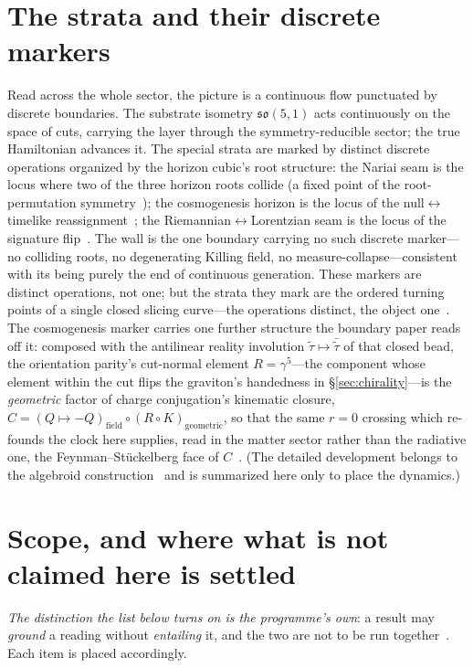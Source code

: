 \documentclass[11pt,a4paper]{article}
\theoremstyle{plain}
\theoremstyle{definition}
\theoremstyle{remark}
\newcommand{\so}{\mathfrak{so}}
\begin{document}
\section{The strata and their discrete markers}\label{sec:discrete}

Read across the whole sector, the picture is a continuous flow punctuated by discrete boundaries. The substrate isometry $\so(5,1)$ acts continuously on the space of cuts, carrying the layer through the symmetry-reducible sector; the true Hamiltonian advances it. The special strata are marked by distinct discrete operations organized by the horizon cubic's root structure: the Nariai seam is the locus where two of the three horizon roots collide (a fixed point of the root-permutation symmetry~\cite{JanzenSlicing,JanzenGroupoid}); the cosmogenesis horizon is the locus of the null$\leftrightarrow$timelike reassignment~\cite{JanzenCRframework}; the Riemannian$\leftrightarrow$Lorentzian seam is the locus of the signature flip~\cite{JanzenSlicing}. The wall is the one boundary carrying no such discrete marker---no colliding roots, no degenerating Killing field, no measure-collapse---consistent with its being purely the end of continuous generation. These markers are distinct operations, not one; but the strata they mark are the ordered turning points of a single closed slicing curve---the operations distinct, the object one~\cite{JanzenSlicing,JanzenCRframework}. The cosmogenesis marker carries one further structure the boundary paper reads off it: composed with the antilinear reality involution $\tilde\tau\mapsto\bar{\tilde\tau}$ of that closed bead, the orientation parity's cut-normal element $R=\gamma^5$---the component whose element within the cut flips the graviton's handedness in \S\ref{sec:chirality}---is the \emph{geometric} factor of charge conjugation's kinematic closure, $C=(Q\mapsto-Q)_{\mathrm{field}}\circ(R\circ K)_{\mathrm{geometric}}$, so that the same $r=0$ crossing which re-founds the clock here supplies, read in the matter sector rather than the radiative one, the Feynman--St\"uckelberg face of $C$~\cite{JanzenBoundary}. (The detailed development belongs to the algebroid construction~\cite{JanzenAlgebroid} and is summarized here only to place the dynamics.)

\section{Scope, and where what is not claimed here is settled}\label{sec:scope}

\emph{The distinction the list below turns on is the programme's own}: a result may \emph{ground} a reading without \emph{entailing} it, and the two are not to be run together~\cite{JanzenShadowExistence}. Each item is placed accordingly.
\end{document}
